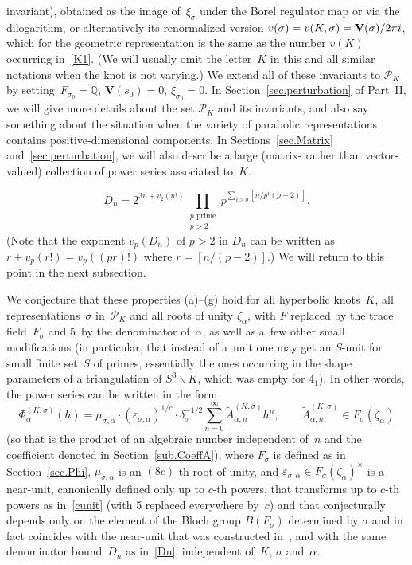 \documentclass[11pt]{article}
\numberwithin{equation}{section}
\numberwithin{equation}{section}
\def\calP{\mathcal P}
\def\calP{\mathcal P}
\def\wt{\widetilde}
\def\z{\zeta}
\def\a{\alpha}
\def\Q{\mathbb Q}
\def\a{\alpha}
\def\z{\zeta}
\def\s{\sigma}
\def\V{\mathbf V}
\def\be{\begin{equation}}
\def\ee{\end{equation}}
\def\ve{\varepsilon}
\def\ssm{\smallsetminus}
\def\tiA{\wt A}
\begin{document}
invariant), obtained as the image of~$\xi_\s$ under the Borel regulator
map or via the dilogarithm, or alternatively its renormalized version
$v(\s)=v(K,\s)=\V(\s)/2\pi {\rm i}$, which for the geometric representation is
the same as the number $v(K)$ occurring in~\eqref{K1}.
(We will usually omit the letter~$K$ in this and all similar notations when
the knot is not varying.) We extend all of these invariants to $\calP_K$
by setting~$F_{\s_0}=\Q$, $\V(s_0)=0$, $\xi_{\s_0}=0$.
In Section~\ref{sec.perturbation} of Part~II,
we will give more details about the set $\calP_K$ and its invariants, and
also say something about the situation when the variety of parabolic
representations contains positive-dimensional components. In
Sections~\ref{sec.Matrix} and~\ref{sec.perturbation}, we will also describe
a large (matrix- rather than vector-valued) collection of power series
associated to~$K$.

\setcounter{section}{9}\setcounter{subsection}{1}\setcounter{equation}{1}
\be
\label{Dn}
D_n = 2^{3n + v_2(n!)} \prod_{\substack{\text{$p$ prime} \\ p>2}}
 p^{ \sum_{i\ge0}[n/p^i(p-2)]} .
\ee
(Note that the exponent $v_p(D_n)$ of $p >2$ in $D_n$ can be written
as $r+v_p(r!) = v_p((p r)!)$ where $r=[n/(p-2)]$.) We will
return to this point in the next subsection.

\setcounter{equation}{3}

We conjecture that these properties (a)--(g) hold for all hyperbolic knots~$K$, all
representations~$\s$ in~$\calP_K$ and all roots of unity $\z_\a$, with $F$ replaced
by the trace field~$F_\s$ and 5~by the denominator of~$\a$, as well as a~few other
small modifications (in particular, that instead of a~unit one may get an $S$-unit
for small finite set~$S$ of primes, essentially the ones occurring in the shape
parameters of a triangulation of $S^3\ssm K$, which was empty for $4_1$). In other
words, the power series \smash{$\Phi^{(K,\s)}_{\a}(h)$} can be written in the form
\be
\label{Phiprec2}
\Phi_\a^{(K,\s)}(h) =\mu_{\s,\a}\cdot(\ve_{\s,\a})^{1/c}
\cdot \delta_\s^{-1/2} \sum_{n=0}^\infty \tiA^{(K,\s)}_{\a,n} h^n ,
\qquad \tiA^{(K,\s)}_{\a,n} \in F_\s(\z_\a)
\ee
(so that \smash{$\tiA^{(K,\s)}_{\a,n}$} is the product of an algebraic number independent of~$n$
and the coefficient denoted \smash{$A^{(K,\s)}_\a(n)$} in Section~\ref{sub.CoeffA}),
where $F_\s$ is defined as in Section~\ref{sec.Phi}, $\mu_{\s,\a}$ is an $(8c)$-th root
of unity, and $\ve_{\s,\a} \in F_\s(\z_\a)^\times$ is a near-unit, canonically defined only
up to $c$-th powers, that transforms up to $c$-th powers as in~\eqref{cunit} (with 5
replaced everywhere by~$c$) and that conjecturally depends only on the element of the
Bloch group $B(F_\s)$ determined by $\s$ and in fact coincides with the near-unit that
was constructed in~\cite{CGZ}, and with the same denominator bound~$D_n$ as
in~\eqref{Dn}, independent of~$K$, $\s$ and~$\a$.
\end{document}
